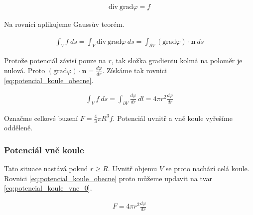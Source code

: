 \documentclass{book}
\newcommand{\vect}[1]{\boldsymbol{#1}}
\newcommand{\grad}{\mathrm{grad}}
\newcommand{\diverg}{\mathrm{div}}
\begin{document}


\begin{equation}
\begin{split}
\diverg \ \grad \varphi = f
\end{split}
\end{equation}

Na rovnici aplikujeme Gaussův teorém.

\begin{equation}
\begin{split}
\int_V f \ ds = \int_V \diverg \ \grad \varphi \ ds = \int_{\partial V} (\grad \varphi) \cdot \vect{n} \ ds
\end{split}
\end{equation}

Protože potenciál závisí pouze na \(r\), tak složka gradientu kolmá na poloměr je nulová. Proto \((\grad \varphi) \cdot \vect{n} = \frac{d \varphi}{dr}\).
Získáme tak rovnici \eqref{eq:potencial_koule_obecne}.

\begin{equation}
\label{eq:potencial_koule_obecne}
\begin{split}
\int_V f \ ds = \int_{\partial V} \frac{d \varphi}{dr} \ dl = 4 \pi r^2 \frac{d \varphi}{dr}
\end{split}
\end{equation}

Označme celkové buzení \(F = \frac{4}{3} \pi R^3 f\).
Potenciál uvnitř a vně koule vyřešíme odděleně.

\subsubsection{Potenciál vně koule}

Tato situace nastává pokud \(r \geq R\). Uvnitř objemu \(V\) se proto nachází celá koule. Rovnici \eqref{eq:potencial_koule_obecne} proto můžeme updavit na tvar \eqref{eq:potencial_koule_vne_0}.

\begin{equation}
\label{eq:potencial_koule_vne_0}
\begin{split}
F = 4 \pi r^2 \frac{d \varphi}{dr}
\end{split}
\end{equation}
\end{document}
